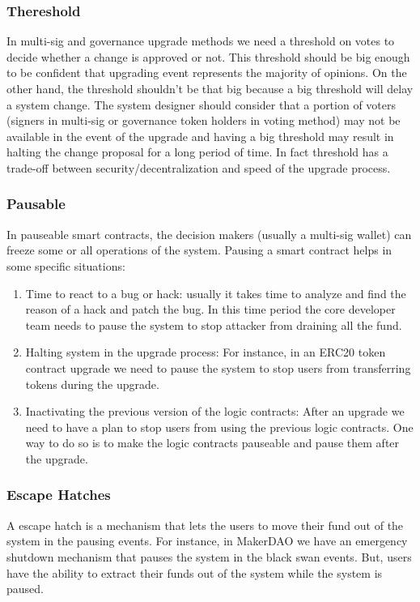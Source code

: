 \subsubsection{Thereshold}
In multi-sig and governance upgrade methods we need a threshold on votes to decide whether a change is approved or not. This threshold should be big enough to be confident that upgrading event represents the majority of opinions. On the other hand, the threshold shouldn't be that big because a big threshold will delay a system change. The system designer should consider that a portion of voters (signers in multi-sig or governance token holders in voting method) may not be available in the event of the upgrade and having a big threshold may result in halting the change proposal for a long period of time. In fact threshold has a trade-off between security/decentralization and speed of the upgrade process.

\subsubsection{Pausable}
In pauseable smart contracts, the decision makers (usually a multi-sig wallet) can freeze some or all operations of the system. Pausing a smart contract helps in some specific situations:

\begin{enumerate}
  \item Time to react to a bug or hack: usually it takes time to analyze and find the reason of a hack and patch the bug. In this time period the core developer team needs to pause the system to stop attacker from draining all the fund.
  \item Halting system in the upgrade process: For instance, in an ERC20 token contract upgrade we need to pause the system to stop users from transferring tokens during the upgrade. 
  \item Inactivating the previous version of the logic contracts: After an upgrade we need to have a plan to stop users from using the previous logic contracts. One way to do so is to make the logic contracts pauseable and pause them after the upgrade. 
\end{enumerate}

\subsubsection{Escape Hatches}
A escape hatch is a mechanism that lets the users to move their fund out of the system in the pausing events. For instance, in MakerDAO we have an emergency shutdown mechanism that pauses the system in the black swan events. But, users have the ability to extract their funds out of the system while the system is paused.
